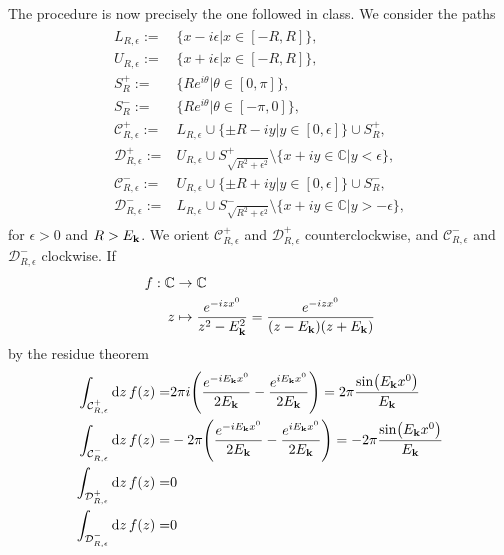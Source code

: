 \documentclass{article}
\begin{document}
The procedure is now precisely the one followed in class. We consider the paths
\begin{align}
\begin{split}
L_{R,\epsilon}:=&\{x-i\epsilon|x\in[-R,R]\},\\
U_{R,\epsilon}:=&\{x+i\epsilon|x\in[-R,R]\},\\
S^+_R:=&\{Re^{i\theta}|\theta\in[0,\pi]\},\\
S^-_R:=&\{Re^{i\theta}|\theta\in[-\pi,0]\},\\
\mathcal{C}^+_{R,\epsilon}:=&L_{R,\epsilon}\cup \{\pm R-iy|y\in[0,\epsilon]\}\cup S^+_R,\\
\mathcal{D}^+_{R,\epsilon}:=&U_{R,\epsilon}\cup S^+_{\sqrt{R^2+\epsilon^2}}\setminus\{x+iy\in\mathbb{C}|y<\epsilon\},\\
\mathcal{C}^-_{R,\epsilon}:=&U_{R,\epsilon}\cup \{\pm R+iy|y\in[0,\epsilon]\}\cup S^-_R,\\
\mathcal{D}^-_{R,\epsilon}:=&L_{R,\epsilon}\cup S^-_{\sqrt{R^2+\epsilon^2}}\setminus\{x+iy\in\mathbb{C}|y>-\epsilon\},
\end{split}
\end{align}
for $\epsilon>0$ and $R>E_{\vb{k}}$. We orient $\mathcal{C}^+_{R,\epsilon}$ and $\mathcal{D}^+_{R,\epsilon}$ counterclockwise, and $\mathcal{C}^-_{R,\epsilon}$ and $\mathcal{D}^-_{R,\epsilon}$ clockwise. If 
\begin{align}
\begin{split}
f:\mathbb{C}&\rightarrow\mathbb{C}\\
z&\mapsto\frac{e^{-izx^0}}{z^2-E_{\vb{k}}^2}=\frac{e^{-izx^0}}{(z-E_{\vb{k}})(z+E_{\vb{k}})}
\end{split}
\end{align}
by the residue theorem
\begin{align}
\begin{split}
\int_{\mathcal{C}^+_{R,\epsilon}}\dd{z}f(z)=&2\pi i\qty(\frac{e^{-iE_{\vb{k}}x^0}}{2E_{\vb{k}}}-\frac{e^{iE_{\vb{k}}x^0}}{2E_{\vb{k}}})=2\pi \frac{\sin(E_{\vb{k}}x^0)}{E_{\vb{k}}}\\
\int_{\mathcal{C}^-_{R,\epsilon}}\dd{z}f(z)=&-2\pi \qty(\frac{e^{-iE_{\vb{k}}x^0}}{2E_{\vb{k}}}-\frac{e^{iE_{\vb{k}}x^0}}{2E_{\vb{k}}})=-2\pi \frac{\sin(E_{\vb{k}}x^0)}{E_{\vb{k}}}\\
\int_{\mathcal{D}^+_{R,\epsilon}}\dd{z}f(z)=&0\\
\int_{\mathcal{D}^-_{R,\epsilon}}\dd{z}f(z)=&0\\
\end{split}
\end{align}
\end{document}
